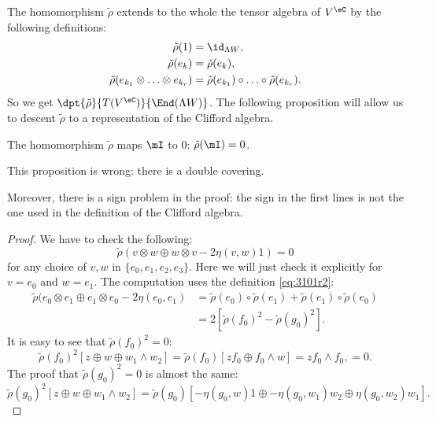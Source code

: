 The homomorphism $\tilde\rho$ extends to the whole the tensor algebra of $V^{\eC}$ by the following definitions:
\begin{subequations}
	\begin{align}
		\tilde\rho(1)                                   & =\id_{\Lambda W}, \\
		\tilde\rho(e_k)                                 & =\tilde\rho(e_k), \\
		\tilde\rho(e_{k_1}\otimes\ldots\otimes e_{k_r}) & =
		\tilde\rho(e_{k_1})\circ\ldots\circ\tilde\rho(e_{k_r}).\label{eq:3101r2}
	\end{align}
\end{subequations}
So we get $\dpt{\tilde\rho}{T(V^{\eC})}{\End(\Lambda W)}$.  The following proposition will allow us to descent $\tilde\rho$ to a representation of the Clifford algebra.

\begin{proposition}
	The homomorphism $\tilde\rho$ maps $\mI$ to $0$: $\tilde\rho(\mI)=0$.
\end{proposition}

\begin{probleme}
	This proposition is wrong: there is a double covering.

	Moreover, there is a sign problem in the proof: the sign in the first lines is not the one used in the definition of the Clifford algebra.
\end{probleme}


\begin{proof}
	We have to check the following:
	\[\tilde\rho(v\otimes w\oplus w\otimes v-2\eta(v,w)1)=0\]
	for any choice of
	$v,w$ in $\{e_0,e_1,e_2,e_3\}$.
	Here we will just check it explicitly for $v=e_0$ and $w=e_1$. The computation uses the definition \eqref{eq:3101r2}:
	\begin{equation}
		\begin{split}
			\tilde\rho(e_0\otimes e_1\oplus e_1\otimes
			e_0-2\eta(e_0,e_1)&=\tilde\rho(e_0)\circ\tilde\rho(e_1)+\tilde\rho(e_1)\circ\tilde\rho(e_0)\\
			&=2\left[\tilde\rho(f_0)^2-\tilde\rho(g_0)^2\right].
		\end{split}
	\end{equation}
	It is easy to see that $\tilde\rho(f_0)^2=0$:
	\begin{equation}
		\tilde\rho(f_0)^2\left[z\oplus w\oplus w_1\wedge w_2 \right]=\tilde\rho(f_0)[zf_0\oplus f_0\wedge w]
		=zf_0\wedge f_0,
		=0.
	\end{equation}
	The proof that $\tilde\rho(g_0)^2=0$ is almost the same:
	\[
		\tilde\rho(g_0)^2\left[z\oplus w\oplus w_1\wedge w_2 \right]
		=\tilde\rho(g_0)[-\eta(g_0,w)1\oplus-\eta(g_0,w_1)w_2\oplus\eta(g_0,w_2)w_1].
	\]

\end{proof}

